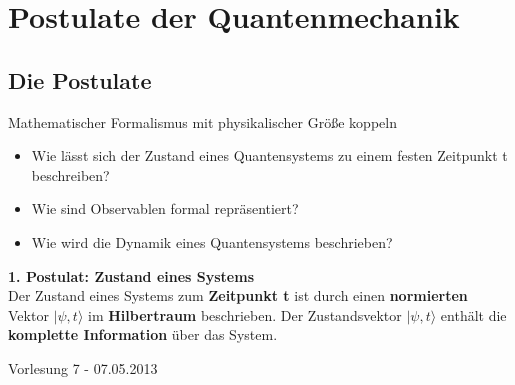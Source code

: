 \documentclass[10pt,article,colorback,accentcolor=tud9d]{scrartcl}
\begin{document}
\section{Postulate der Quantenmechanik}
\subsection{Die Postulate}
 Mathematischer Formalismus mit physikalischer Größe koppeln
      \begin{itemize}
        \item Wie lässt sich der Zustand eines Quantensystems zu einem festen Zeitpunkt t beschreiben?
        \item Wie sind Observablen formal repräsentiert?
        \item Wie wird die Dynamik eines Quantensystems beschrieben?
      \end{itemize}
  \textbf{1. Postulat: Zustand eines Systems}\\
    Der Zustand eines Systems zum \textbf{Zeitpunkt t} ist durch einen \textbf{normierten} Vektor $|\psi,t\rangle$ im \textbf{Hilbertraum} beschrieben. Der Zustandsvektor $|\psi,t\rangle$ enthält die \textbf{komplette Information} über das System.
    
    \begin{flushright}
    Vorlesung 7 - 07.05.2013
    \end{flushright}
    
\end{document}
